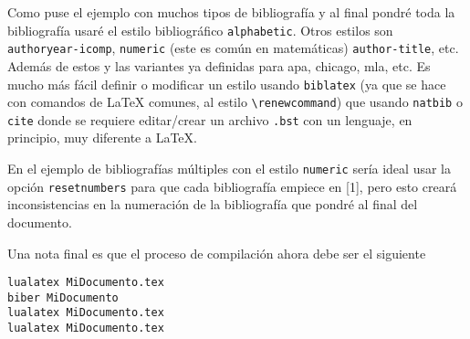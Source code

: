 Como puse el ejemplo con muchos tipos de bibliografía y al final pondré toda
la bibliografía usaré el estilo bibliográfico \texttt{alphabetic}.
Otros estilos son \texttt{authoryear-icomp}, \texttt{numeric} (este es común
en matemáticas) \texttt{author-title}, etc. Además de estos y las variantes
ya definidas para apa, chicago, mla, etc. Es mucho más fácil definir o
modificar un estilo usando \texttt{biblatex} (ya que se hace con comandos de
\LaTeX{} comunes, al estilo \verb|\renewcommand|) que usando \texttt{natbib}
o \texttt{cite} donde se requiere editar/crear un archivo \texttt{.bst} con
un lenguaje, en principio, muy diferente a \LaTeX.

En el ejemplo de bibliografías múltiples con el estilo \texttt{numeric}
sería ideal usar la opción \texttt{resetnumbers} para que cada bibliografía
empiece en [1], pero esto creará inconsistencias en la numeración de la
bibliografía que pondré al final del documento.

Una nota final es que el proceso de compilación ahora debe ser el siguiente
\begin{flushleft}
\verb|lualatex MiDocumento.tex|\\
\verb|biber MiDocumento|\\
\verb|lualatex MiDocumento.tex|\\
\verb|lualatex MiDocumento.tex|
\end{flushleft}
